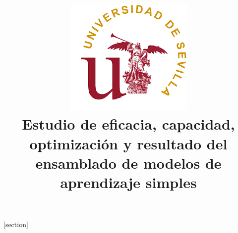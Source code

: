 \documentclass[conference,a4paper]{IEEEtran}
\begin{document}
[section] \setcounter{textb}{0}
\renewcommand{\thetextb}{\arabic{section}.\arabic{textb}}
\newenvironment{textb}[1][]{%
\refstepcounter{textb}%
\ifstrempty{#1}%
{\mdfsetup{%
frametitle={%
\tikz[baseline=(current bounding box)]
\node[rectangle,fill=white]
{\strut};}}%
}%
{\mdfsetup{%
frametitle={%
\tikz[baseline=(current bounding box)]
\node[rectangle, fill=black!10,draw=black] %
{\strut#1};}}%
}%
\mdfsetup{innertopmargin=10pt, linecolor=black!80,%
linewidth=2pt,topline=true,%
frametitleaboveskip=\dimexpr-\ht\strutbox\relax
}
\begin{mdframed}[]\relax%
}{\end{mdframed}}


\title{\includegraphics[scale=0.45]{figures/logo-us.png}\\Estudio de eficacia, capacidad, optimización y resultado del ensamblado de modelos de aprendizaje simples}

\author{
  
  \and
  
}

\maketitle
\end{document}
